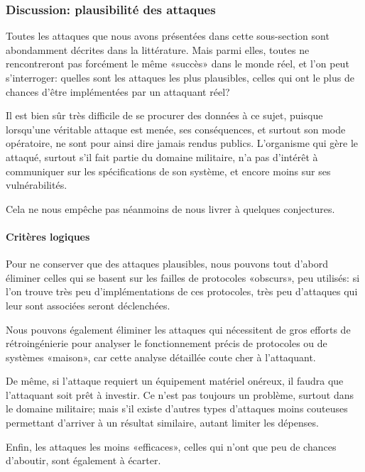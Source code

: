     \subsubsection{Discussion: plausibilité des attaques}
Toutes les attaques que nous avons présentées dans cette sous-section sont abondamment décrites dans la littérature.
Mais parmi elles, toutes ne rencontreront pas forcément le même «succès» dans le monde réel, et l'on peut s'interroger: quelles sont les attaques les plus plausibles, \cad celles qui ont le plus de chances d'être implémentées par un attaquant réel?

Il est bien sûr très difficile de se procurer des données à ce sujet, puisque lorsqu'une véritable attaque est menée, ses conséquences, et surtout son mode opératoire, ne sont pour ainsi dire jamais rendus publics.
L'organisme qui gère le \rc attaqué, surtout s'il fait partie du domaine militaire, n'a pas d'intérêt à communiquer sur les spécifications de son système, et encore moins sur ses vulnérabilités.

Cela ne nous empêche pas néanmoins de nous livrer à quelques conjectures.

        \paragraph{Critères logiques}
Pour ne conserver que des attaques plausibles, nous pouvons tout d'abord éliminer celles qui se basent sur les failles de protocoles «obscurs», peu utilisés: si l'on trouve très peu d'implémentations de ces protocoles, très peu d'attaques qui leur sont associées seront déclenchées.

Nous pouvons également éliminer les attaques qui nécessitent de gros efforts de rétroingénierie pour analyser le fonctionnement précis de protocoles ou de systèmes «maison», car cette analyse détaillée coute cher à l'attaquant.

De même, si l'attaque requiert un équipement matériel onéreux, il faudra que l'attaquant soit prêt à investir.
Ce n'est pas toujours un problème, surtout dans le domaine militaire; mais s'il existe d'autres types d'attaques moins couteuses permettant d'arriver à un résultat similaire, autant limiter les dépenses.

Enfin, les attaques les moins «efficaces», celles qui n'ont que peu de chances d'aboutir, sont également à écarter.

